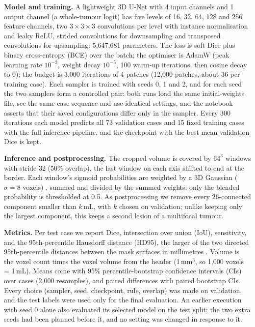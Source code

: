 \documentclass[11pt,a4paper]{article}
\begin{document}
\textbf{Model and training.} A lightweight 3D U-Net \cite{ronneberger2015,cicek2016} with 4 input channels and 1 output
channel (a whole-tumour logit) has five levels of 16, 32, 64, 128 and 256 feature channels, two $3\times3\times3$
convolutions per level with instance normalisation \cite{ulyanov2016} and leaky ReLU, strided convolutions for
downsampling and transposed convolutions for upsampling: 5,647,681 parameters. The loss is soft Dice \cite{milletari2016}
plus binary cross-entropy (BCE) over the batch; the optimiser is AdamW \cite{loshchilov2019} (peak learning rate $10^{-3}$,
weight decay $10^{-5}$, 100 warm-up iterations, then cosine decay to 0); the budget is 3,000 iterations of 4 patches
(12,000 patches, about 36 per training case). Each sampler is trained with seeds 0, 1 and 2, and for each seed the two
samplers form a controlled pair: both runs load the same initial-weights file, see the same case sequence and use
identical settings, and the notebook asserts that their saved
configurations differ only in the sampler. Every 300 iterations each model predicts all 73 validation cases and 15 fixed
training cases with the full inference pipeline, and the checkpoint with the best mean validation Dice is kept.

\textbf{Inference and postprocessing.} The cropped volume is covered by $64^3$ windows with stride 32 (50\% overlap), the
last window on each axis shifted to end at the border. Each window's sigmoid probabilities are weighted by a 3D Gaussian
($\sigma=8$ voxels) \cite{isensee2021}, summed and divided by the summed weights; only the blended probability is
thresholded at 0.5. As postprocessing we remove every 26-connected component smaller than $k$\,mL, with $k$ chosen on
validation; unlike keeping only the largest component, this keeps a second lesion of a multifocal tumour.

\textbf{Metrics.} Per test case we report Dice, intersection over union (IoU), sensitivity, and the 95th-percentile
Hausdorff distance (HD95), the larger of the two directed 95th-percentile distances between the mask surfaces in
millimetres \cite{taha2015,maierhein2024}. Volume is the voxel count times the voxel volume from the header (1\,mm$^3$, so
1,000 voxels = 1\,mL). Means come with 95\% percentile-bootstrap confidence intervals (CIs) over cases (2,000 resamples), and
paired differences with paired bootstrap CIs. Every choice (sampler, seed, checkpoint, rule, overlap) was made on validation, and the test labels were used
only for the final evaluation. An earlier execution with seed 0 alone also evaluated its selected model on the test
split; the two extra seeds had been planned before it, and no setting was changed in response to it.
\end{document}
